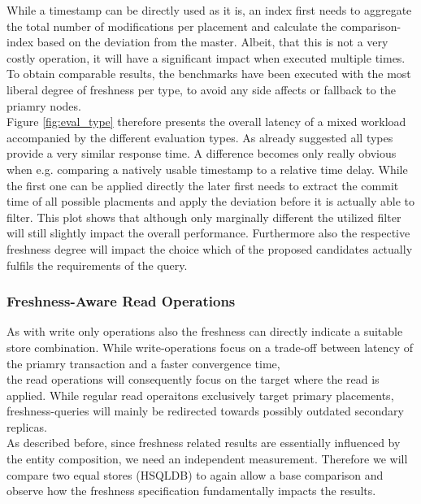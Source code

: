 While a timestamp can be directly used as it is, an index first needs to aggregate the total number of modifications per placement and 
calculate the comparison-index based on the deviation from the master.
Albeit, that this is not a very costly operation, it will have a significant impact when executed multiple times.
To obtain comparable results, the benchmarks have been executed with the most liberal degree of freshness per type, to avoid any side affects or fallback to the priamry nodes.\\
Figure \ref{fig:eval_type} therefore presents the overall latency of a mixed workload accompanied by the different evaluation types.
As already suggested all types provide a very similar response time. A difference becomes only really obvious when e.g. comparing a natively usable
timestamp to a relative time delay. While the first one can be applied directly the later first
needs to extract the commit time of all possible placments and apply the deviation before it is actually able to filter.
This plot shows that although only marginally different the utilized filter will still slightly impact the overall performance.
Furthermore also the respective freshness degree will impact the choice which of the proposed candidates actually fulfils the requirements of the query.




\subsubsection{Freshness-Aware Read Operations}

As with write only operations also the freshness can directly indicate a suitable store combination.
While write-operations focus on a trade-off between latency of the priamry transaction and a faster convergence time,\\
the read operations will consequently focus on the target where the read is applied. While regular read operaitons exclusively target
primary placements, freshness-queries will mainly be redirected towards possibly outdated secondary replicas.\\


As described before, since freshness related results are essentially influenced by the entity composition, we need an independent measurement.
Therefore we will  compare two equal stores (HSQLDB) to again allow a base comparison and observe how the freshness specification fundamentally impacts the results.\\


